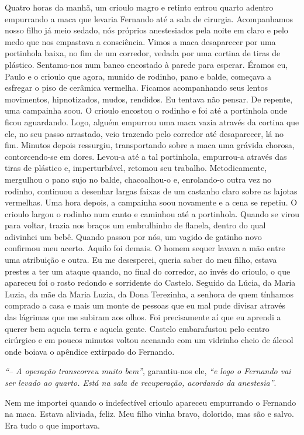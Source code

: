 Quatro horas da manhã, um crioulo magro e retinto entrou quarto adentro empurrando a maca que levaria Fernando até a sala de cirurgia.
Acompanhamos nosso filho já meio sedado, nós próprios anestesiados pela noite em claro e pelo medo que nos empastava a consciência.
Vimos a maca desaparecer por uma portinhola baixa, no fim de um corredor, vedada por uma cortina de tiras de plástico.
Sentamo-nos num banco encostado à parede para esperar.
Éramos eu, Paulo e o crioulo que agora, munido de rodinho, pano e balde, começava a esfregar o piso de cerâmica vermelha.
Ficamos acompanhando seus lentos movimentos, hipnotizados, mudos, rendidos.
Eu tentava não pensar.
De repente, uma campainha soou.
O crioulo encostou o rodinho e foi até a portinhola onde ficou aguardando.
Logo, alguém empurrou uma maca vazia através da cortina que ele, no seu passo arrastado, veio trazendo pelo corredor até desaparecer, lá no fim.
Minutos depois ressurgiu, transportando sobre a maca uma grávida chorosa, contorcendo-se em dores.
Levou-a até a tal portinhola, empurrou-a através das tiras de plástico e, imperturbável, retomou seu trabalho.
Metodicamente, mergulhou o pano sujo no balde, chacoalhou-o e, enrolando-o outra vez no rodinho, continuou a desenhar largas faixas de um castanho claro sobre as lajotas vermelhas.
Uma hora depois, a campainha soou novamente e a cena se repetiu.
O crioulo largou o rodinho num canto e caminhou até a portinhola.
Quando se virou para voltar, trazia nos braços um embrulhinho de flanela, dentro do qual adivinhei um bebê.
Quando passou por nós, um vagido de gatinho novo confirmou meu acerto.
Aquilo foi demais.
O homem sequer lavava a mão entre uma atribuição e outra.
Eu me desesperei, queria saber do meu filho, estava prestes a ter um ataque quando, no final do corredor, ao invés do crioulo, o que apareceu foi o rosto redondo e sorridente do Castelo.
Seguido da Lúcia, da Maria Luzia, da mãe da Maria Luzia, da Dona Terezinha, a senhora de quem tínhamos comprado a casa e mais um monte de pessoas que eu mal pude divisar através das lágrimas que me subiram aos olhos.
Foi precisamente aí que eu aprendi a querer bem aquela terra e aquela gente.
Castelo embarafustou pelo centro cirúrgico e em poucos minutos voltou acenando com um vidrinho cheio de álcool onde boiava o apêndice extirpado do Fernando.

\textit{``-- A operação transcorreu muito bem''}, garantiu-nos ele, \textit{``e logo o Fernando vai ser levado ao quarto.
Está na sala de recuperação, acordando da anestesia''}.

Nem me importei quando o indefectível crioulo apareceu empurrando o Fernando na maca.
Estava aliviada, feliz.
Meu filho vinha bravo, dolorido, mas são e salvo.
Era tudo o que importava.


